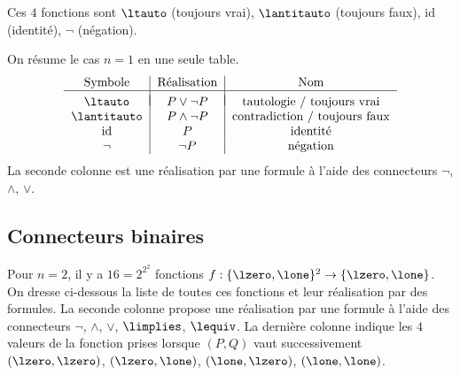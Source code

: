 \documentclass[11pt,class=report,crop=false]{standalone}
\begin{document}
Ces $4$ fonctions sont $\ltauto$ (toujours vrai), $\lantitauto$ (toujours faux), $\mathrm{id}$ (identité), $\lnot$ (négation).

On résume le cas $n=1$ en une seule table.
\[
\begin{tabular}{c|c|c}
	Symbole & Réalisation & Nom \\
	\hline
	&& \\[-2ex]
	$\ltauto$ 		& $P \lor \lnot P$ 	& tautologie / toujours vrai \\
	$\lantitauto$  	& $P \land \lnot P$ 	& contradiction / toujours faux \\
	$\mathrm{id}$ 		& $P$  		& identité \\
	$\lnot$  	& $\lnot P$   		& négation \\	
\end{tabular}
\]
La seconde colonne est une réalisation par une formule à l'aide des connecteurs $\lnot$, $\land$, $\lor$.



\subsection{Connecteurs binaires}

Pour $n=2$, il y a $16 = 2^{2^2}$ fonctions $f : \{\lzero,\lone\}^2 \to \{\lzero,\lone\}$.
On dresse ci-dessous la liste de toutes ces fonctions et leur réalisation par des formules.
La seconde colonne propose une réalisation par une formule à l'aide des connecteurs $\lnot$, $\land$, $\lor$, $\limplies$, $\lequiv$.
La dernière colonne indique les $4$ valeurs de la fonction prises lorsque $(P,Q)$ vaut successivement $(\lzero,\lzero)$, $(\lzero,\lone)$, $(\lone,\lzero)$, $(\lone,\lone)$.
\end{document}
